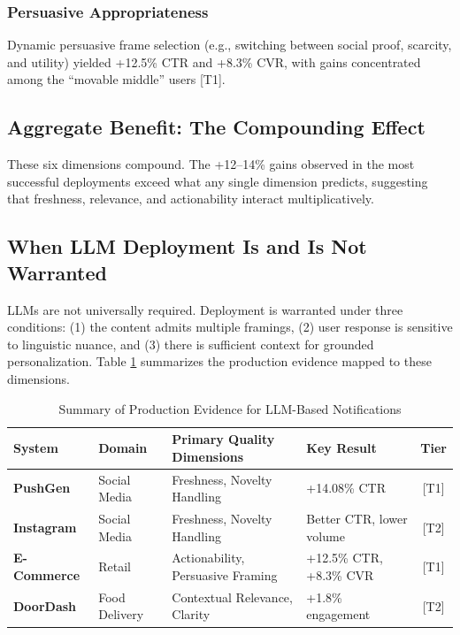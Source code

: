 \documentclass[sigconf]{acmart}
\begin{document}
\subsubsection{Persuasive Appropriateness}
Dynamic persuasive frame selection (e.g., switching between social proof, scarcity, and utility) yielded +12.5\% CTR and +8.3\% CVR, with gains concentrated among the ``movable middle'' users \cite{acm2025ecommerce} [T1].

\subsection{Aggregate Benefit: The Compounding Effect}

These six dimensions compound. The +12--14\% gains observed in the most successful deployments exceed what any single dimension predicts, suggesting that freshness, relevance, and actionability interact multiplicatively.

\subsection{When LLM Deployment Is and Is Not Warranted}

LLMs are not universally required. Deployment is warranted under three conditions: (1) the content admits multiple framings, (2) user response is sensitive to linguistic nuance, and (3) there is sufficient context for grounded personalization. Table \ref{tab:evidence} summarizes the production evidence mapped to these dimensions.

\begin{table}[t]
\caption{Summary of Production Evidence for LLM-Based Notifications}
\label{tab:evidence}
\begin{tabular}{p{3cm}p{2.5cm}p{5cm}p{4cm}c}
\toprule
\textbf{System} & \textbf{Domain} & \textbf{Primary Quality Dimensions} & \textbf{Key Result} & \textbf{Tier} \\
\midrule
\textbf{PushGen \cite{bie2026pushgen}} & Social Media & Freshness, Novelty Handling & +14.08\% CTR & [T1] \\
\textbf{Instagram \cite{sun2025ranking}} & Social Media & Freshness, Novelty Handling & Better CTR, lower volume & [T2] \\
\textbf{E-Commerce \cite{acm2025ecommerce}} & Retail & Actionability, Persuasive Framing & +12.5\% CTR, +8.3\% CVR & [T1] \\
\textbf{DoorDash \cite{sinha2024doordash}} & Food Delivery & Contextual Relevance, Clarity & +1.8\% engagement & [T2] \\
\bottomrule
\end{tabular}
\end{table}
\end{document}
